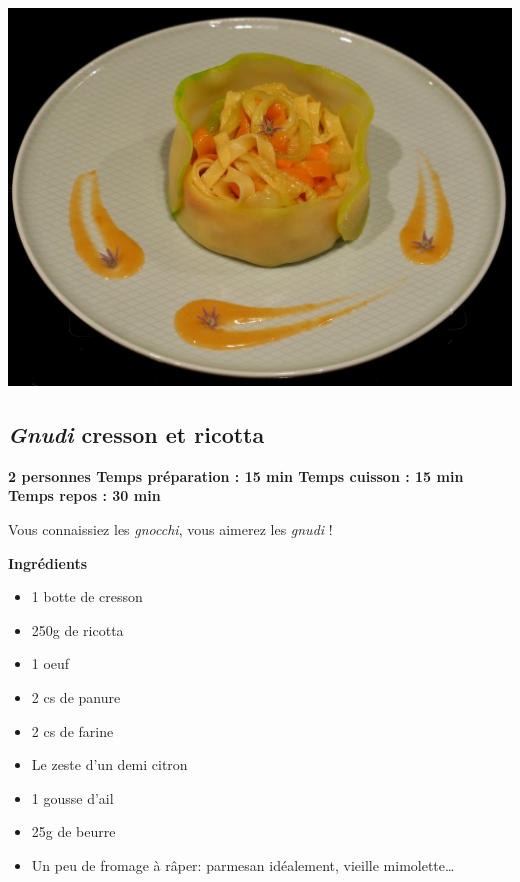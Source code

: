 \documentclass[]{book}
\providecommand{\tightlist}{%
  \setlength{\itemsep}{0pt}\setlength{\parskip}{0pt}}
\begin{document}
\begin{center}\includegraphics[width=0.9\linewidth]{photos/tagliatelles_crevettes} \end{center}

\subsection*{\texorpdfstring{{\emph{Gnudi} cresson et
ricotta}}{Gnudi cresson et ricotta}}\label{gnudi-cresson-et-ricotta}

\begin{salebox}
\textbf{2 personnes \textbar{} Temps préparation : 15 min \textbar{}
Temps cuisson : 15 min \textbar{} Temps repos : 30 min}

Vous connaissiez les \emph{gnocchi}, vous aimerez les \emph{gnudi} !
\end{salebox}

 \textbf{Ingrédients}

\begin{itemize}
\tightlist
\item
  1 botte de cresson
\item
  250g de ricotta
\item
  1 oeuf
\item
  2 cs de panure
\item
  2 cs de farine
\item
  Le zeste d'un demi citron
\item
  1 gousse d'ail
\item
  25g de beurre
\item
  Un peu de fromage à râper: parmesan idéalement, vieille
  mimolette\ldots{}
\end{itemize}
\end{document}
